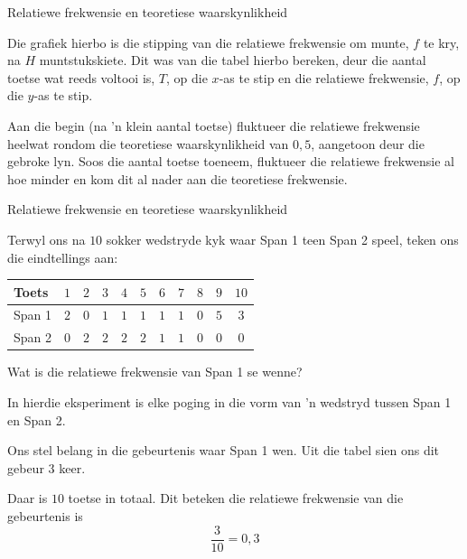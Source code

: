 \begin{wex}{Relatiewe frekwensie en teoretiese waarskynlikheid}
{Die grafiek hierbo is die stipping van die relatiewe frekwensie om munte, $ f $ te kry,
na $ H $ muntstukskiete. Dit was van die tabel hierbo bereken, deur die aantal toetse wat reeds voltooi is, $ T $, op die $ x $-as te stip en die relatiewe frekwensie, $ f $, op die $ y $-as te stip.\par

Aan die begin (na 'n klein aantal toetse) fluktueer die relatiewe frekwensie heelwat rondom die teoretiese waarskynlikheid van $0,5$, aangetoon deur die gebroke lyn. Soos die aantal toetse toeneem, fluktueer die relatiewe frekwensie al hoe minder en kom dit al nader aan die teoretiese frekwensie.


}
\end{wex}


\begin{wex}{Relatiewe frekwensie en teoretiese waarskynlikheid}{
  Terwyl ons na $10$ sokker wedstryde kyk waar Span 1 teen Span 2 speel, teken ons die eindtellings aan:
    \begin{center}
      \begin{tabular}{lcccccccccc}
        \toprule
        Toets  & $1$ & $2$ & $3$ & $4$ & $5$ & $6$ & $7$ & $8$ & $9$ & $10$ \\
        \midrule
        Span 1 & $2$ & $0$ & $1$ & $1$ & $1$ & $1$ & $1$ & $0$ & $5$ & $3$ \\
        Span 2 & $0$ & $2$ & $2$ & $2$ & $2$ & $1$ & $1$ & $0$ & $0$ & $0$ \\
        \bottomrule
      \end{tabular}
    \end{center}
  Wat is die relatiewe frekwensie van Span 1 se wenne?
}{
  In hierdie eksperiment is elke poging in die vorm van 'n wedstryd tussen Span 1 en Span 2.


  Ons stel belang in die gebeurtenis waar Span 1 wen. Uit die tabel sien ons dit gebeur $3$ keer.


  Daar is $10$ toetse in totaal. Dit beteken die relatiewe frekwensie van die gebeurtenis is \[\frac{3}{10} = 0,3\]
}
\end{wex}

